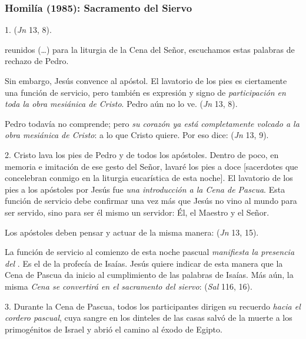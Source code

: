 \label{b-05-01-1982H}
\newpage

\subsubsection{Homilía (1985): Sacramento del Siervo}


\begin{body}
1.  (\textit{Jn} 13, 8). 

 reunidos (\ldots) para la liturgia de la Cena del Señor, escuchamos estas palabras de rechazo de Pedro. 

Sin embargo, Jesús convence al apóstol. El lavatorio de los pies es ciertamente una función de servicio, pero también es expresión y signo de \textit{participación en toda la obra mesiánica de Cristo}. Pedro aún no lo ve.  (\textit{Jn} 13, 8). 

Pedro todavía no comprende; pero \textit{su corazón ya está completamente volcado a la obra mesiánica de Cristo}: a lo que Cristo quiere. Por eso dice:  (\textit{Jn} 13, 9). 

2. Cristo lava los pies de Pedro y de todos los apóstoles. Dentro de poco, en memoria e imitación de ese gesto del Señor, lavaré los pies a doce [sacerdotes que concelebran conmigo en la liturgia eucarística de esta noche]. El lavatorio de los pies a los apóstoles por Jesús fue \textit{una introducción a la Cena de Pascua}. Esta función de servicio debe confirmar una vez más que Jesús no vino al mundo para ser servido, sino para ser él mismo un servidor: Él, el Maestro y el Señor. 

Los apóstoles deben pensar y actuar de la misma manera:  (\textit{Jn} 13, 15). 

La función de servicio al comienzo de esta noche pascual \textit{manifiesta la presencia del }. Es el  de la profecía de Isaías. Jesús quiere indicar de esta manera que la Cena de Pascua da inicio al cumplimiento de las palabras de Isaías. Más aún, la misma \textit{Cena se convertirá en el sacramento del siervo}:  (\textit{Sal} 116, 16). 

3. Durante la Cena de Pascua, todos los participantes dirigen su recuerdo \textit{hacia el cordero pascual}, cuya sangre en los dinteles de las casas salvó de la muerte a los primogénitos de Israel y abrió el camino al éxodo de Egipto. 


\end{body}

